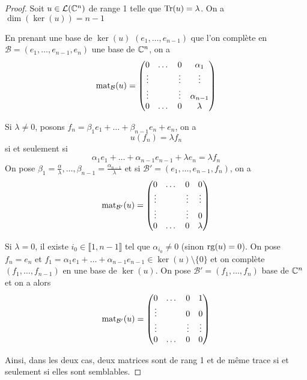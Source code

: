 \begin{proof}
    Soit $u\in\mathcal{L}(\mathbb{C}^{n})$ de range 1 telle que $\operatorname{Tr}(u)=\lambda$. On a $\dim(\ker(u))=n-1$

    En prenant une base de $\ker(u)$ $(e_{1},\dots,e_{n-1})$ que l'on complète en $\mathcal{B}=(e_{1},\dots,e_{n-1},e_{n})$ une base de $\mathbb{C}^{n}$, on a 
    \begin{equation}
        \operatorname{mat}_{\mathcal{B}}(u)
        =
        \begin{pmatrix}
            0 & \dots & 0 & \alpha_{1}\\
            \vdots & & \vdots &\vdots\\
            \vdots & & \vdots &\alpha_{n-1}\\
            0 & \dots & 0& \lambda
        \end{pmatrix}
    \end{equation}

    Si $\lambda\neq0$, posons $f_{n}=\beta_{1}e_{1}+\dots+\beta_{n-1}e_{n}+e_{n}$, on a 
    \begin{equation}
        u(f_{n})=\lambda f_{n}
    \end{equation}
    si et seulement si
    \begin{equation}
        \alpha_{1}e_{1}+\dots+\alpha_{n-1}e_{n-1}+\lambda e_{n}=\lambda f_{n}
    \end{equation}
    On pose $\beta_{1}=\frac{\alpha}{\lambda},\dots,\beta_{n-1}=\frac{\alpha_{n-1}}{\lambda}$ et si $\mathcal{B}'=(e_{1},\dots,e_{n-1},f_{n})$, on a 
    \begin{equation}
        \operatorname{mat}_{\mathcal{B}'}(u)=
        \begin{pmatrix}
            0 & \dots & 0 & 0\\
            \vdots & & \vdots &\vdots\\
            \vdots & & \vdots &0\\
            0 & \dots & 0& \lambda
        \end{pmatrix}
    \end{equation}

    Si $\lambda=0$, il existe $i_{0}\in\llbracket 1,n-1\rrbracket$ tel que $\alpha_{i_{0}}\neq0$ (sinon $\operatorname{rg}(u)=0$). On pose $f_{n}=e_{n}$ et $f_{1}=\alpha_{1}e_{1}+\dots+\alpha_{n-1}e_{n-1}\in\ker(u)\setminus\lbrace0\rbrace$ et on complète $(f_{1},\dots,f_{n-1})$ en une base de $\ker(u)$. On pose $\mathcal{B}'=(f_{1},\dots,f_{n})$ base de $\mathbb{C}^{n}$ et on a alors 
    \begin{equation}
        \operatorname{mat}_{\mathcal{B}'}(u)=
        \begin{pmatrix}
            0 & \dots & 0 & 1\\
            \vdots & & 0 &0\\
            \vdots & & \vdots &\vdots\\
            0 & \dots & 0& 0
        \end{pmatrix}
    \end{equation}

    Ainsi, dans les deux cas, deux matrices sont de rang 1 et de même trace si et seulement si elles sont semblables.
\end{proof}

